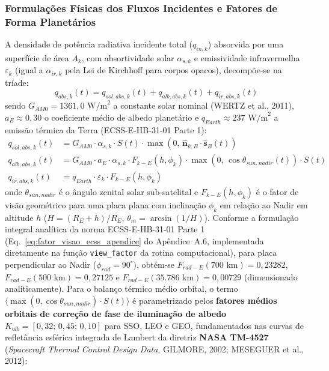 \subsubsection{Formulações Físicas dos Fluxos Incidentes e Fatores de Forma Planetários}

A densidade de potência radiativa incidente total ($q_{in,k}$) absorvida por uma superfície de área $A_k$, com absortividade solar $\alpha_{s,k}$ e emissividade infravermelha $\varepsilon_{k}$ (igual a $\alpha_{ir,k}$ pela Lei de Kirchhoff para corpos opacos), decompõe-se na tríade:
\begin{equation}
    q_{abs,k}(t) = q_{sol,abs,k}(t) + q_{alb,abs,k}(t) + q_{ir,abs,k}(t)
    \label{eq:triade_fluxos}
\end{equation}
sendo $G_{AM0} = 1361{,}0\text{ W/m}^2$ a constante solar nominal (WERTZ et al., 2011), $a_E \approx 0{,}30$ o coeficiente médio de albedo planetário e $q_{Earth} \approx 237\text{ W/m}^2$ a emissão térmica da Terra (ECSS-E-HB-31-01 Parte 1):
\begin{align}
    q_{sol,abs,k}(t) &= G_{AM0} \cdot \alpha_{s,k} \cdot S(t) \cdot \max\left( 0, \, \hat{\mathbf{n}}_{k,B} \cdot \hat{\mathbf{s}}_B(t) \right) \label{eq:fluxo_solar_direto} \\
    q_{alb,abs,k}(t) &= G_{AM0} \cdot a_E \cdot \alpha_{s,k} \cdot F_{k-E}(h, \phi_k) \cdot \max\left( 0, \, \cos \theta_{sun,nadir}(t) \right) \cdot S(t) \label{eq:fluxo_albedo_exato} \\
    q_{ir,abs,k}(t) &= q_{Earth} \cdot \varepsilon_k \cdot F_{k-E}(h, \phi_k) \label{eq:fluxo_ir_exato}
\end{align}
onde $\theta_{sun,nadir}$ é o ângulo zenital solar sub-satelital e $F_{k-E}(h, \phi_k)$ é o fator de visão geométrico para uma placa plana com inclinação $\phi_k$ em relação ao Nadir em altitude $h$ ($H = (R_E + h) / R_E$, $\theta_m = \arcsin(1/H)$). Conforme a formulação integral analítica da norma ECSS-E-HB-31-01 Parte 1 (Eq.~\ref{eq:fator_visao_ecss_apendice} do Apêndice~A.6, implementada diretamente na função \texttt{view\_factor} da rotina computacional), para placa perpendicular ao Nadir ($\phi_{rad} = 90^\circ$), obtém-se $F_{rad-E}(700\text{ km}) = 0{,}23282$, $F_{rad-E}(500\text{ km}) = 0{,}27125$ e $F_{rad-E}(35.786\text{ km}) = 0{,}00729$ (dimensionado analiticamente). Para o balanço térmico médio orbital, o termo $\langle \max(0, \cos\theta_{sun,nadir}) \cdot S(t) \rangle$ é parametrizado pelos \textbf{fatores médios orbitais de correção de fase de iluminação de albedo} $K_{alb} = [0{,}32; \, 0{,}45; \, 0{,}10]$ para SSO, LEO e GEO, fundamentados nas curvas de refletância esférica integrada de Lambert da diretriz \textbf{NASA TM-4527} (\textit{Spacecraft Thermal Control Design Data}, GILMORE, 2002; MESEGUER et al., 2012):
